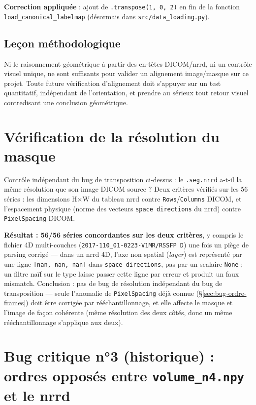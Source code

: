 \textbf{Correction appliquée} : ajout de \texttt{.transpose(1, 0, 2)} en fin de la fonction
\texttt{load\_canonical\_labelmap} (désormais dans \texttt{src/data\_loading.py}).

\subsection{Leçon méthodologique}

Ni le raisonnement géométrique à partir des en-têtes DICOM/nrrd, ni un contrôle visuel unique, ne sont
suffisants pour valider un alignement image/masque sur ce projet. Toute future vérification
d'alignement doit s'appuyer sur un test quantitatif, indépendant de l'orientation, et prendre au
sérieux tout retour visuel contredisant une conclusion géométrique.

\section{Vérification de la résolution du masque}
\label{sec:resolution-masque}

Contrôle indépendant du bug de transposition ci-dessus : le \texttt{.seg.nrrd} a-t-il la même
résolution que son image DICOM source ? Deux critères vérifiés sur les 56 séries : les dimensions
H$\times$W du tableau nrrd contre \texttt{Rows}/\texttt{Columns} DICOM, et l'espacement physique
(norme des vecteurs \texttt{space directions} du nrrd) contre \texttt{PixelSpacing} DICOM.

\textbf{Résultat : 56/56 séries concordantes sur les deux critères}, y compris le fichier 4D
multi-couches (\texttt{2017-110\_01-0223-V1MR/RSSFP D}) une fois un piège de parsing corrigé --- dans
un nrrd 4D, l'axe non spatial (\emph{layer}) est représenté par une ligne \texttt{[nan, nan, nan]}
dans \texttt{space directions}, pas par un scalaire \texttt{None} ; un filtre naïf sur le type laisse
passer cette ligne par erreur et produit un faux mismatch. Conclusion : pas de bug de résolution
indépendant du bug de transposition --- seule l'anomalie de \texttt{PixelSpacing} déjà connue
(\S\ref{sec:bug-ordre-frames}) doit être corrigée par rééchantillonnage, et elle affecte le masque et
l'image de façon cohérente (même résolution des deux côtés, donc un même rééchantillonnage s'applique
aux deux).

\section{Bug critique n°3 (historique) : ordres opposés entre \texttt{volume\_n4.npy} et le nrrd}

